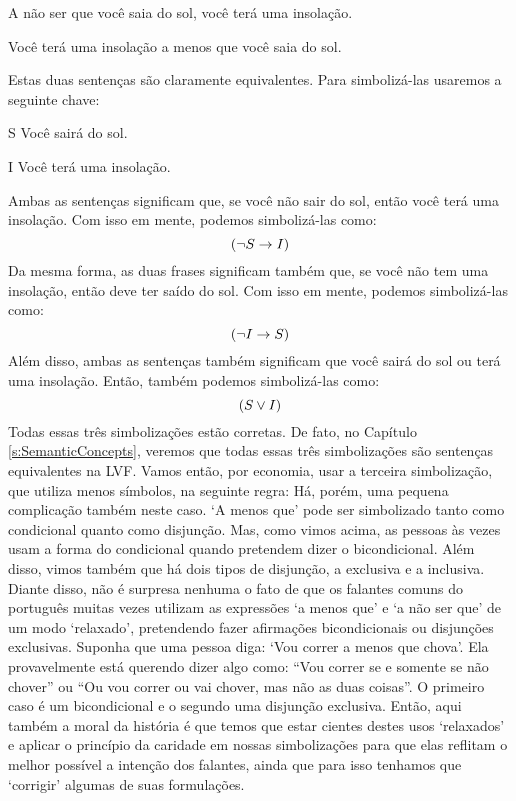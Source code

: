 \begin{earg}
\item[\ex{unless1}] A não ser que você saia do sol, você terá uma insolação.
\item[\ex{unless2}] Você terá uma insolação a menos que você saia do sol.
\end{earg}
Estas duas sentenças são claramente equivalentes.
Para simbolizá-las usaremos a seguinte chave:
	\begin{ekey}
		\item[S] Você sairá do sol.
		\item[I] Você terá uma insolação.
	\end{ekey}
Ambas as sentenças significam que, se você não sair do sol, então você terá uma insolação.
Com isso em mente, podemos simbolizá-las como:
$$(\neg S \rightarrow I)$$
Da mesma forma, as duas frases significam também que, se você não tem uma insolação, então deve ter saído do sol.
Com isso em mente, podemos simbolizá-las como:
$$(\neg I \rightarrow S)$$
Além disso, ambas as sentenças também significam que você sairá do sol ou terá uma insolação. Então, também podemos simbolizá-las como:
$$(S \vee I)$$
Todas essas três simbolizações estão corretas.
De fato, no Capítulo \ref{s:SemanticConcepts}, veremos que todas essas três simbolizações são sentenças equivalentes na LVF.
Vamos então, por economia, usar a terceira simbolização, que utiliza menos símbolos, na seguinte regra:
Há, porém, uma pequena complicação também neste caso.
`A menos que' pode ser simbolizado tanto como condicional quanto como disjunção.
Mas, como vimos acima, as pessoas às vezes usam a forma do condicional quando pretendem dizer o bicondicional.
Além disso, vimos também que há dois tipos de disjunção, a exclusiva e a inclusiva.
Diante disso, não é surpresa nenhuma o fato de que os falantes comuns do português muitas vezes utilizam as expressões `a menos que' e `a não ser que' de um modo `relaxado', pretendendo fazer afirmações bicondicionais ou disjunções exclusivas.
Suponha que uma pessoa diga:
`Vou correr a menos que chova'.
Ela provavelmente está querendo dizer algo como:
``Vou correr se e somente se não chover'' ou ``Ou vou correr ou vai chover, mas não as duas coisas''.
O primeiro caso é um bicondicional e o segundo uma disjunção exclusiva.
Então, aqui também a moral da história é que temos que estar cientes destes usos `relaxados' e aplicar o princípio da caridade em nossas simbolizações para que elas reflitam o melhor possível a intenção dos falantes, ainda que para isso tenhamos que `corrigir' algumas de suas formulações.


